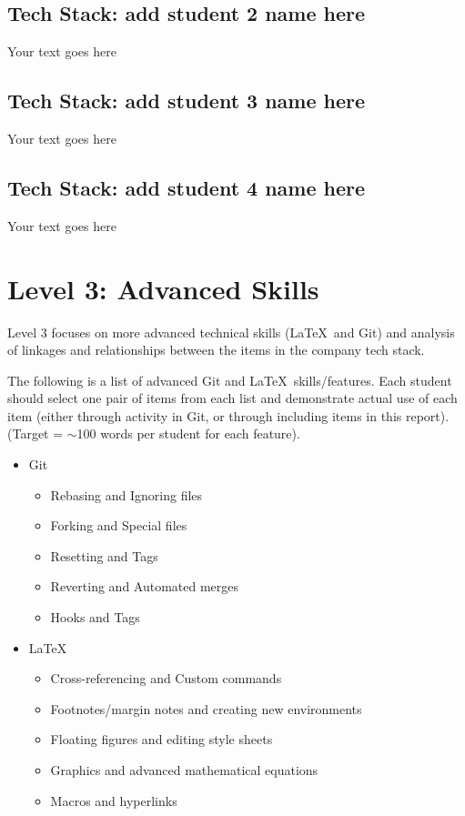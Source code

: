\documentclass[a4paper, 11pt]{report}
\begin{document}
\subsection{Tech Stack: add student 2 name here}

Your text goes here

\subsection{Tech Stack: add student 3 name here}

Your text goes here

\subsection{Tech Stack: add student 4 name here}

Your text goes here



\newpage
\section{Level 3: Advanced Skills}

Level 3 focuses on more advanced technical skills (\LaTeX\ and Git) and analysis of linkages and relationships between the items in the company tech stack.

The following is a list of advanced Git and \LaTeX\ skills/features. Each student should select one pair of items from each list and demonstrate actual use of each item (either through activity in Git, or through including items in this report). (Target = $\sim$100 words per student for each feature).
\begin{itemize}
    \item Git
    \begin{itemize}
        \item Rebasing and Ignoring files
        \item Forking and Special files
        \item Resetting and Tags
        \item Reverting and Automated merges
        \item Hooks and Tags
    \end{itemize}
    \item \LaTeX\ 
    \begin{itemize}
        \item Cross-referencing and Custom commands
        \item Footnotes/margin notes and creating new environments
        \item Floating figures and editing style sheets
        \item Graphics and advanced mathematical equations
        \item Macros and hyperlinks
    \end{itemize}
\end{itemize}
\end{document}

